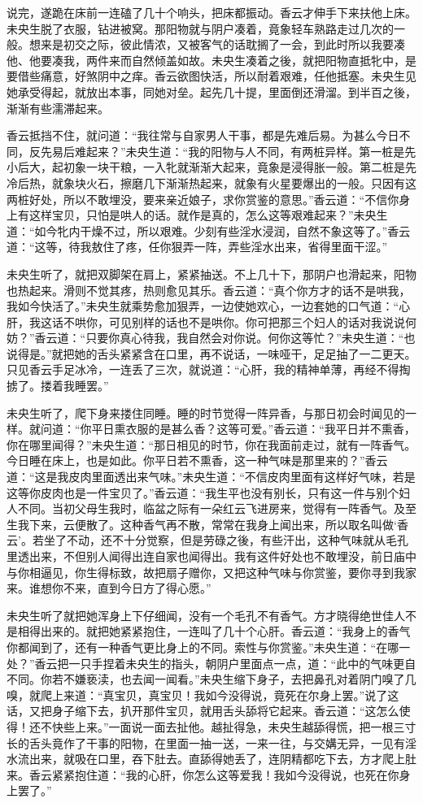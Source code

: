 \documentclass[a4paper,12pt,UTF8,twoside]{ctexbook}
\begin{document}
说完，遂跪在床前一连磕了几十个响头，把床都振动。香云才伸手下来扶他上床。未央生脱了衣服，钻进被窝。那阳物就与阴户凑着，竟象轻车熟路走过几次的一般。想来是初交之际，彼此情浓，又被客气的话耽搁了一会，到此时所以我要凑他、他要凑我，两件来而自然倾盖如故。未央生凑着之後，就把阳物直抵牝中，是要借些痛意，好煞阴中之痒。香云欲图快活，所以耐着艰难，任他抵塞。未央生见她承受得起，就放出本事，同她对垒。起先几十提，里面倒还滑溜。到半百之後，渐渐有些濡滞起来。

香云抵挡不住，就问道：“我往常与自家男人干事，都是先难后易。为甚么今日不同，反先易后难起来？”未央生道：“我的阳物与人不同，有两桩异样。第一桩是先小后大，起初象一块干粮，一入牝就渐渐大起来，竟象是浸得胀一般。第二桩是先冷后热，就象块火石，擦磨几下渐渐热起来，就象有火星要爆出的一般。只因有这两桩好处，所以不敢埋没，要来亲近娘子，求你赏鉴的意思。”香云道：“不信你身上有这样宝贝，只怕是哄人的话。就作是真的，怎么这等艰难起来？”未央生道：“如今牝内干燥不过，所以艰难。少刻有些淫水浸润，自然不象这等了。”香云道：“这等，待我敖住了疼，任你狠弄一阵，弄些淫水出来，省得里面干涩。”

未央生听了，就把双脚架在肩上，紧紧抽送。不上几十下，那阴户也滑起来，阳物也热起来。滑则不觉其疼，热则愈见其乐。香云道：“真个你方才的话不是哄我，我如今快活了。”未央生就乘势愈加狠弄，一边使她欢心，一边套她的口气道：“心肝，我这话不哄你，可见别样的话也不是哄你。你可把那三个妇人的话对我说说何妨？”香云道：“只要你真心待我，我自然会对你说。何你这等忙？”未央生道：“也说得是。”就把她的舌头紧紧含在口里，再不说话，一味哑干，足足抽了一二更天。只见香云手足冰冷，一连丢了三次，就说道：“心肝，我的精神单薄，再经不得掏掳了。搂着我睡罢。”

未央生听了，爬下身来搂住同睡。睡的时节觉得一阵异香，与那日初会时闻见的一样。就问道：“你平日熏衣服的是甚么香？这等可爱。”香云道：“我平日并不熏香，你在哪里闻得？”未央生道：“那日相见的时节，你在我面前走过，就有一阵香气。今日睡在床上，也是如此。你平日若不熏香，这一种气味是那里来的？”香云道：“这是我皮肉里面透出来气味。”未央生道：“不信皮肉里面有这样好气味，若是这等你皮肉也是一件宝贝了。”香云道：“我生平也没有别长，只有这一件与别个妇人不同。当初父母生我时，临盆之际有一朵红云飞进房来，觉得有一阵香气。及至生我下来，云便散了。这种香气再不散，常常在我身上闻出来，所以取名叫做‘香云’。若坐了不动，还不十分觉察，但是劳碌之後，有些汗出，这种气味就从毛孔里透出来，不但别人闻得出连自家也闻得出。我有这件好处也不敢埋没，前日庙中与你相逼见，你生得标致，故把扇子赠你，又把这种气味与你赏鉴，要你寻到我家来。谁想你不来，直到今日方了得心愿。”

未央生听了就把她浑身上下仔细闻，没有一个毛孔不有香气。方才晓得绝世佳人不是相得出来的。就把她紧紧抱住，一连叫了几十个心肝。香云道：“我身上的香气你都闻到了，还有一种香气更比身上的不同。索性与你赏鉴。”未央生道：“在哪一处？”香云把一只手捏着未央生的指头，朝阴户里面点一点，道：“此中的气味更自不同。你若不嫌亵渎，也去闻一闻看。”未央生缩下身子，去把鼻孔对着阴门嗅了几嗅，就爬上来道：“真宝贝，真宝贝！我如今没得说，竟死在尔身上罢。”说了这话，又把身子缩下去，扒开那件宝贝，就用舌头舔将它起来。香云道：“这怎么使得！还不快些上来。”一面说一面去扯他。越扯得急，未央生越舔得慌，把一根三寸长的舌头竟作了干事的阳物，在里面一抽一送，一来一往，与交媾无异，一见有淫水流出来，就吸在口里，吞下肚去。直舔得她丢了，连阴精都吃下去，方才爬上肚来。香云紧紧抱住道：“我的心肝，你怎么这等爱我！我如今没得说，也死在你身上罢了。”
\end{document}
